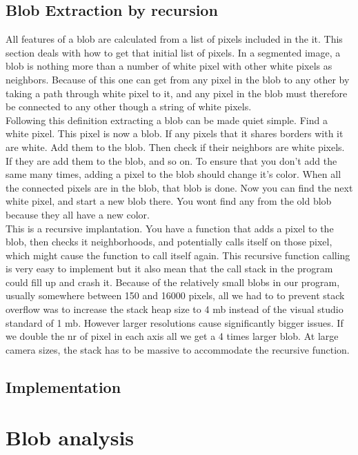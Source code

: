 \subsection{Blob Extraction by recursion}
All features of a blob are calculated from a list of pixels included in the it. This section deals with how to get that initial list of pixels. In a segmented image, a blob is nothing more than a number of white pixel with other white pixels as neighbors. Because of this one can get from any pixel in the blob to any other by taking a path through white pixel to it, and any pixel in the blob must therefore be connected to any other though a string of white pixels.\\
Following this definition extracting a blob can be made quiet simple. Find a white pixel. This pixel is now a blob.  If any pixels that it shares borders with it are white. Add them to the blob. Then check if their neighbors are white pixels. If they are add them to the blob, and so on. To ensure that you don't add the same  many times, adding a pixel to the blob should change it's color. When all the connected pixels are in the blob, that blob is done. Now you can find the next white pixel, and start a new blob there. You wont find any from the old blob because they all have a new color.\\
This is a recursive implantation. You have a function that adds a pixel to the blob, then checks it neighborhoods, and potentially calls itself on those pixel, which might cause the function to call itself again. This recursive function calling is very easy to implement but it also mean that the call stack in the program could fill up and crash it.  
Because of the relatively small blobs in our program, usually somewhere between 150 and 16000 pixels, all we had to to prevent stack overflow was to increase the stack heap size to 4 mb instead of the visual studio standard of 1 mb. However larger resolutions cause significantly bigger issues. If we double the nr of pixel in each axis all we get a 4 times larger blob. At large camera sizes, the stack has to be massive to accommodate the recursive function.
\subsection{Implementation}
\section{Blob analysis}
